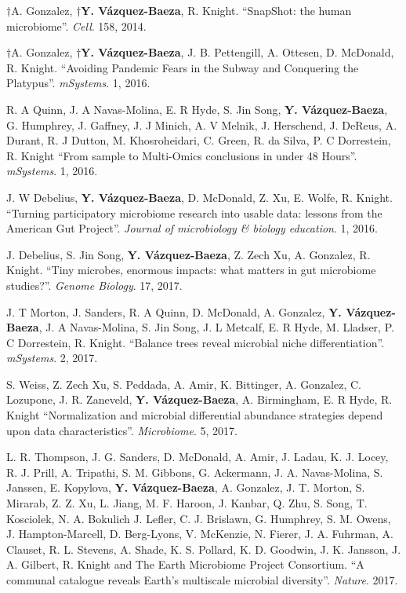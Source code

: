 \begin{frontmatter}
\begin{vitapage}
\begin{publications}
    \item $\dagger$A. Gonzalez, \textbf{$\dagger$Y. V\'azquez-Baeza}, R.  
        Knight. ``SnapShot: the human microbiome''. \emph{Cell}. 158, 2014.

    \item $\dagger$A. Gonzalez, \textbf{$\dagger$Y. V\'azquez-Baeza},  J. B. Pettengill, A. Ottesen, D. McDonald, R. Knight. ``Avoiding Pandemic Fears in the Subway and Conquering the Platypus''. \emph{mSystems}. 1, 2016.

    \item R. A Quinn, J. A Navas-Molina, E. R Hyde, S. Jin Song, \textbf{Y. V\'azquez-Baeza}, G. Humphrey, J. Gaffney, J. J Minich, A. V Melnik, J. Herschend, J. DeReus, A. Durant, R. J Dutton, M. Khosroheidari, C. Green, R. da Silva, P. C Dorrestein, R. Knight ``From sample to Multi-Omics conclusions in under 48 Hours''. \emph{mSystems}. 1, 2016.

    \item J. W Debelius, \textbf{Y. V\'azquez-Baeza}, D. McDonald, Z. Xu, E. Wolfe, R. Knight. ``Turning participatory microbiome research into usable data: lessons from the American Gut Project''. \emph{Journal of microbiology \& biology education}. 1, 2016.

    \item J. Debelius, S. Jin Song, \textbf{Y. V\'azquez-Baeza}, Z. Zech Xu, A. Gonzalez, R. Knight. ``Tiny microbes, enormous impacts: what matters in gut microbiome studies?''. \emph{Genome Biology}. 17, 2017.

    \item J. T Morton, J. Sanders, R. A Quinn, D. McDonald, A. Gonzalez, \textbf{Y. V\'azquez-Baeza}, J. A Navas-Molina, S. Jin Song, J. L Metcalf, E. R Hyde, M. Lladser, P. C Dorrestein, R. Knight. ``Balance trees reveal microbial niche differentiation''. \emph{mSystems}. 2, 2017.

    \item S. Weiss, Z. Zech Xu, S. Peddada, A. Amir, K. Bittinger, A. Gonzalez, C. Lozupone, J. R. Zaneveld, \textbf{Y. V\'azquez-Baeza}, A. Birmingham, E. R Hyde, R. Knight ``Normalization and microbial differential abundance strategies depend upon data characteristics''. \emph{Microbiome}. 5, 2017.

    \item L. R. Thompson, J. G. Sanders, D. McDonald, A. Amir, J. Ladau, K. J.  
        Locey, R. J. Prill, A. Tripathi, S. M.  Gibbons, G. Ackermann, J. A.  
        Navas-Molina, S. Janssen, E. Kopylova, \textbf{Y. V\'azquez-Baeza}, A.  
        Gonzalez, J. T. Morton, S. Mirarab, Z. Z. Xu, L. Jiang, M. F.  Haroon, 
        J.  Kanbar, Q.  Zhu, S. Song, T. Kosciolek, N. A. Bokulich J. Lefler, 
        C. J.  Brislawn, G. Humphrey, S. M. Owens, J. Hampton-Marcell, D.  
        Berg-Lyons, V. McKenzie, N. Fierer, J. A. Fuhrman, A. Clauset, R. L.  
        Stevens, A.  Shade, K. S. Pollard, K. D. Goodwin, J. K. Jansson, J. A.  
        Gilbert, R.  Knight and The Earth Microbiome Project Consortium. ``A 
        communal catalogue reveals Earth’s multiscale microbial diversity''.
        \emph{Nature}. 2017.
\end{publications}


\end{vitapage}
\end{frontmatter}
